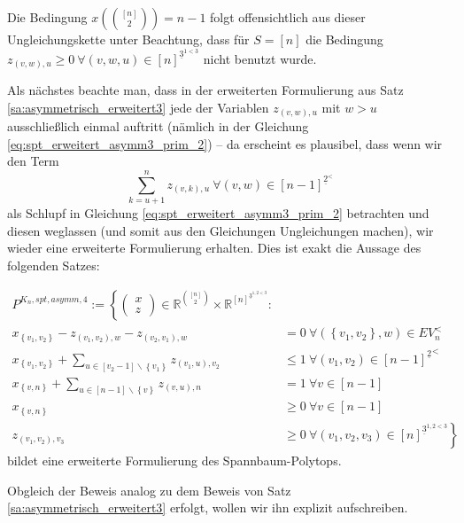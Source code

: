 \documentclass[10p,a4paper,BCOR = 12mm, DIV=15]{scrbook}
\begin{document}
{\begin{bew}
Die Bedingung $x\left({\left[n\right] \choose 2}\right) = n-1$ folgt offensichtlich aus dieser Ungleichungskette unter Beachtung, dass für $S=\left[n\right]$ die Bedingung $z_{\left(v, w\right), u} \geq 0 \ \forall \left(v, w, u\right) \in \left[n\right]^{\underline{3}^{1<3}}$ nicht benutzt wurde.
\end{bew}

Als nächstes beachte man, dass in der erweiterten Formulierung aus Satz \ref{sa:asymmetrisch_erweitert3} jede der Variablen $z_{\left(v, w\right), u}$ mit $w>u$ ausschließlich einmal auftritt (nämlich in der Gleichung \eqref{eq:spt_erweitert_asymm3_prim_2}) -- da erscheint es plausibel, dass wenn wir den Term
\begin{displaymath}
\sum_{k=u+1}^n z_{\left(v, k\right), u} \ \forall \left(v, w\right)\in \left[n-1\right]^{\underline{2}^<}
\end{displaymath}
als Schlupf in Gleichung \eqref{eq:spt_erweitert_asymm3_prim_2} betrachten und diesen weglassen (und somit aus den Gleichungen Ungleichungen machen), wir wieder eine erweiterte Formulierung erhalten. Dies ist exakt die Aussage des folgenden Satzes:

\begin{Sa}
\label{sa:asymmetrisch_erweitert4}
\begin{align}
P^{K_n, spt, asymm, 4} := \left\{
\left(\begin{array}{c}
x \\
z
\end{array}\right)\in \mathbb{R}^{[n]\choose 2} \times \mathbb{R}^{\left[n\right]^{\underline{3}^{1, 2<3}}}: \nonumber\right. \\
x_{\left\{v_1, v_2\right\}} - z_{\left(v_1, v_2\right), w} - z_{\left(v_2, v_1\right), w} & = 0\ \forall \left(\left\{v_1, v_2\right\}, w\right)\in EV_n^< \label{eq:spt_erweitert_asymm4_prim_1} \\
x_{\left\{v_1, v_2\right\}} + \sum_{u\in[v_2-1]\backslash\left\{v_1\right\}} z_{\left(v_1, u\right), v_2} & \leq 1\ \forall \left(v_1, v_2\right)\in {[n-1]^{\underline{2}}}^<  \label{eq:spt_erweitert_asymm4_prim_2} \\
x_{\left\{v, n\right\}} + \sum_{u\in[n-1]\backslash\left\{v\right\}} z_{\left(v, u\right), n} & = 1\ \forall v \in [n-1] \label{eq:spt_erweitert_asymm4_prim_2,5} \\
x_{\left\{v, n\right\}} & \geq 0 \ \forall v\in \left[n-1\right] \label{eq:spt_erweitert_asymm4_x_n} \\
z_{\left(v_1, v_2\right), v_3} & \left. \geq 0 \ \forall \left(v_1, v_2, v_3\right)\in \left[n\right]^{\underline{3}^{1, 2<3}} \right\} \label{eq:spt_erweitert_asymm4_z}
\end{align}
bildet eine erweiterte Formulierung des Spannbaum-Polytops.
\end{Sa}
\begin{bew}
Obgleich der Beweis analog zu dem Beweis von Satz \ref{sa:asymmetrisch_erweitert3} erfolgt, wollen wir ihn explizit aufschreiben.


\end{bew}}
\end{document}
